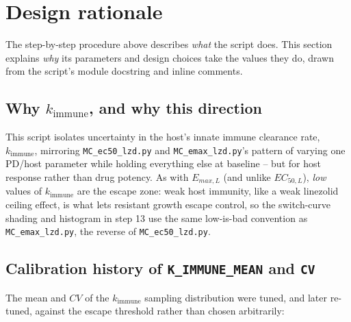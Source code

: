 \documentclass[11pt]{article}
\begin{document}
\section{Design rationale}

The step-by-step procedure above describes \emph{what} the script does. This
section explains \emph{why} its parameters and design choices take the
values they do, drawn from the script's module docstring and inline
comments.

\subsection{Why $k_{\mathrm{immune}}$, and why this direction}

This script isolates uncertainty in the host's innate immune clearance rate,
$k_{\mathrm{immune}}$, mirroring \texttt{MC\_ec50\_lzd.py} and
\texttt{MC\_emax\_lzd.py}'s pattern of varying one PD/host parameter while
holding everything else at baseline -- but for host response rather than
drug potency. As with $E_{max,L}$ (and unlike $EC_{50,L}$), \emph{low}
values of $k_{\mathrm{immune}}$ are the escape zone: weak host immunity, like
a weak linezolid ceiling effect, is what lets resistant growth escape
control, so the switch-curve shading and histogram in step 13 use the same
low-is-bad convention as \texttt{MC\_emax\_lzd.py}, the reverse of
\texttt{MC\_ec50\_lzd.py}.

\subsection{Calibration history of \texttt{K\_IMMUNE\_MEAN} and \texttt{CV}}

The mean and $CV$ of the $k_{\mathrm{immune}}$ sampling distribution were
tuned, and later re-tuned, against the escape threshold rather than chosen
arbitrarily:
\end{document}
